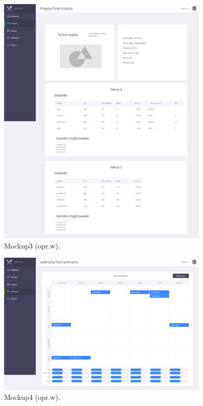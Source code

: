 \begin{minipage}{\textwidth}
    \begin{figure}[H]
        \centering\includegraphics[width=0.9\textwidth]{img/mockups/mockup3.png}
        \caption{Mockup3 (opr.w).}\label{rysunek:mockup3}
    \end{figure}
\end{minipage}

\begin{minipage}{\textwidth}
    \begin{figure}[H]
        \centering\includegraphics[width=0.9\textwidth]{img/mockups/mockup4.png}
        \caption{Mockup4 (opr.w).}\label{rysunek:mockup4}
    \end{figure}
\end{minipage}

